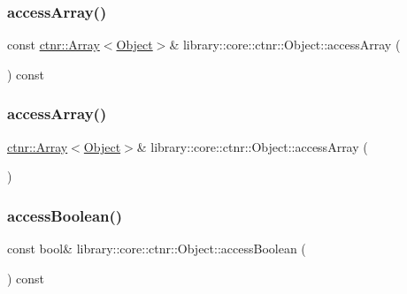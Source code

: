 \subsubsection{\texorpdfstring{access\+Array()}{accessArray()}\hspace{0.1cm}{\footnotesize\ttfamily [1/2]}}
{\footnotesize\ttfamily const \hyperlink{classlibrary_1_1core_1_1ctnr_1_1_array}{ctnr\+::\+Array}$<$\hyperlink{classlibrary_1_1core_1_1ctnr_1_1_object}{Object}$>$\& library\+::core\+::ctnr\+::\+Object\+::access\+Array (\begin{DoxyParamCaption}{ }\end{DoxyParamCaption}) const}

\mbox{\label{classlibrary_1_1core_1_1ctnr_1_1_object_af4d1752c7624a8a9b7005d2b14dd1898}} 
\subsubsection{\texorpdfstring{access\+Array()}{accessArray()}\hspace{0.1cm}{\footnotesize\ttfamily [2/2]}}
{\footnotesize\ttfamily \hyperlink{classlibrary_1_1core_1_1ctnr_1_1_array}{ctnr\+::\+Array}$<$\hyperlink{classlibrary_1_1core_1_1ctnr_1_1_object}{Object}$>$\& library\+::core\+::ctnr\+::\+Object\+::access\+Array (\begin{DoxyParamCaption}{ }\end{DoxyParamCaption})}

\mbox{\label{classlibrary_1_1core_1_1ctnr_1_1_object_a0624bcf2292bb76848f3c284eb537d88}} 
\subsubsection{\texorpdfstring{access\+Boolean()}{accessBoolean()}\hspace{0.1cm}{\footnotesize\ttfamily [1/2]}}
{\footnotesize\ttfamily const bool\& library\+::core\+::ctnr\+::\+Object\+::access\+Boolean (\begin{DoxyParamCaption}{ }\end{DoxyParamCaption}) const}

